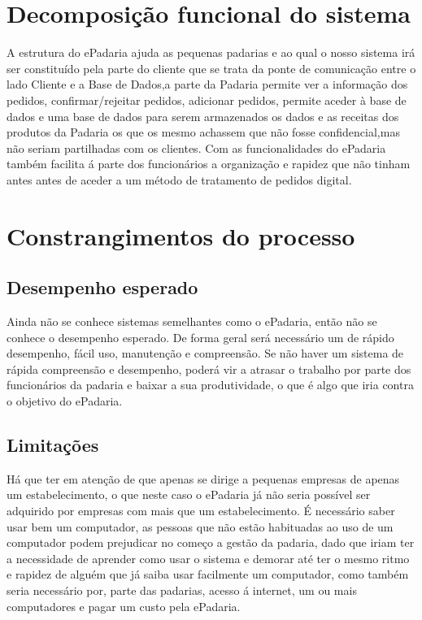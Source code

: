 \section{Decomposição funcional do sistema}


A estrutura do ePadaria ajuda as pequenas padarias e ao qual o nosso sistema irá ser constituído pela parte do cliente que se trata da ponte de comunicação entre o lado Cliente e a Base de Dados,a parte da Padaria permite ver a informação dos pedidos, confirmar/rejeitar pedidos, adicionar pedidos, permite aceder à base de dados e uma base de dados para serem armazenados os dados e as receitas dos produtos da Padaria os que os mesmo achassem que não fosse confidencial,mas não seriam partilhadas com os clientes. Com as funcionalidades do ePadaria também facilita á parte dos funcionários a organização e rapidez que não tinham antes antes de aceder a um método de tratamento de pedidos digital.

\section{Constrangimentos do processo}
\subsection{Desempenho esperado}
Ainda não se conhece sistemas semelhantes como o ePadaria, então não se conhece o desempenho esperado. De forma geral será necessário um de rápido desempenho, fácil uso, manutenção e compreensão. Se não haver um sistema de rápida compreensão e desempenho, poderá vir a atrasar o trabalho por parte dos funcionários da padaria e baixar a sua produtividade, o que é algo que iria contra o objetivo do ePadaria.

\subsection{Limitações} 
Há que ter em atenção de que apenas se dirige a pequenas empresas de apenas um estabelecimento, o que neste caso o ePadaria já não seria possível ser adquirido por empresas com mais que um estabelecimento. É necessário saber usar bem um computador, as pessoas que não estão habituadas ao uso de um computador podem prejudicar no começo a gestão da padaria, dado que iriam ter a necessidade de aprender como usar o sistema e demorar até ter o mesmo ritmo e rapidez de alguém que já saiba usar facilmente um computador, como também seria necessário por, parte das padarias, acesso á internet, um ou mais computadores e pagar um custo pela ePadaria.\\
